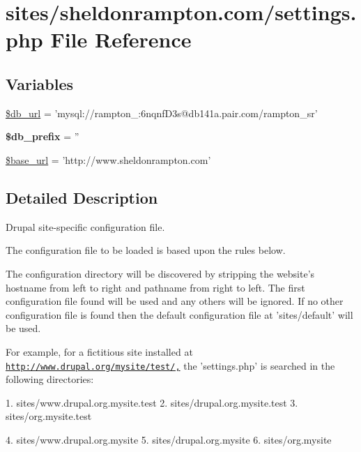 \hypertarget{sheldonrampton_8com_2settings_8php}{
\section{sites/sheldonrampton.com/settings.php File Reference}
\label{sheldonrampton_8com_2settings_8php}
}
\subsection*{Variables}
\begin{CompactItemize}
\item 
\hyperlink{sheldonrampton_8com_2settings_8php_01f60cfc6d59f1f30585ac6b516d739b}{\$db\_\-url} = 'mysql://rampton\_:6nqnfD3s@db141a.pair.com/rampton\_\-sr'
\item 
\hypertarget{sheldonrampton_8com_2settings_8php_f2a4215b966f1c790a75937650bde991}{
\textbf{\$db\_\-prefix} = ''}
\label{sheldonrampton_8com_2settings_8php_f2a4215b966f1c790a75937650bde991}

\item 
\hyperlink{sheldonrampton_8com_2settings_8php_6886427c9c643f707fcb35c018049bc7}{\$base\_\-url} = 'http://www.sheldonrampton.com'
\end{CompactItemize}


\subsection{Detailed Description}
Drupal site-specific configuration file.

The configuration file to be loaded is based upon the rules below.

The configuration directory will be discovered by stripping the website's hostname from left to right and pathname from right to left. The first configuration file found will be used and any others will be ignored. If no other configuration file is found then the default configuration file at 'sites/default' will be used.

For example, for a fictitious site installed at \href{http://www.drupal.org/mysite/test/,}{\tt http://www.drupal.org/mysite/test/,} the 'settings.php' is searched in the following directories:

1. sites/www.drupal.org.mysite.test 2. sites/drupal.org.mysite.test 3. sites/org.mysite.test

4. sites/www.drupal.org.mysite 5. sites/drupal.org.mysite 6. sites/org.mysite

